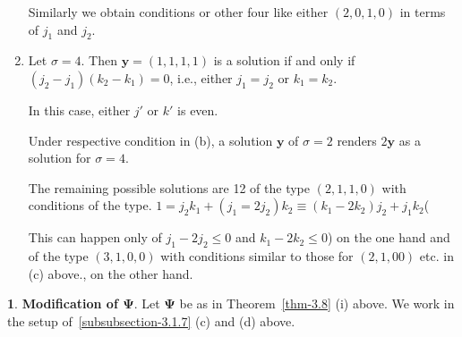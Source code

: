 \documentclass[a4paper,12pt]{article}
\theoremstyle{definition}
\theoremstyle{underlinethm}
\theoremstyle{definition}
\newtheorem{subsubsec}{}[subsection]
\begin{document}
\begin{enumerate}[label=(\alph*)]
Similarly we obtain conditions or other four like either $(2,0,1,0)$ in terms of $j_{1}$ and $j_{2}$. 

\item Let $\sigma = 4$. Then $\mathbf{y} = (1,1,1,1)$ is a solution if and only if $\left(j_{2} -j_{1} \right)\left(k_{2}-k_{1}\right) = 0$, i.e., either $j_{1} =j_{2}$ or $k_{1}=k_{2}$.

In this case, either $j'$ or $k'$ is even. 

Under respective condition in (b), a solution $\mathbf{y}$ of $\sigma=2$ renders $2\mathbf{y}$ as a solution for $\sigma=4$. 

The remaining possible solutions are 12 of the type $(2,1,1,0)$ with conditions of the type. $1 = j_{2}k_{1} + (j_{1} =2j_{2})k_{2} \equiv (k_{1}-2k_{2})j_{2} + j_{1}k_{2}$(

This can happen only of $j_{1}-2j_{2} \leq 0$ and $k_{1} - 2k_{2} \leq 0$) on the one hand and of the type $(3,1,0,0)$ with conditions similar to those for $(2,1,00)$  etc. in (c) above., on the other hand. 

\end{enumerate}


\begin{subsubsec}\label{subsubsection-3.1.10}
\textbf{Modification of $\boldsymbol{\Psi}$}. Let $\boldsymbol{\Psi}$ be as in Theorem~\eqref{thm-3.8} (i) above. We work in the setup of~\eqref{subsubsection-3.1.7} (c) and (d) above.
\end{subsubsec}
\end{document}
